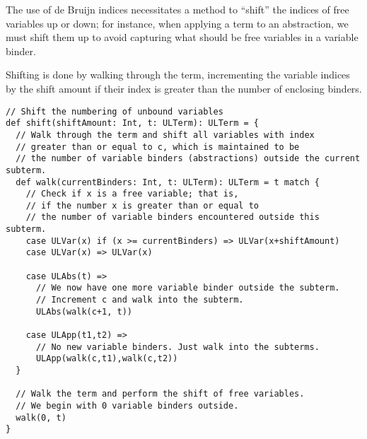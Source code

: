 \documentclass[11pt]{article}
\begin{document}
The use of de Bruijn indices necessitates a method to
“shift” the indices of free variables up or down;
for instance, when applying a term to an abstraction,
we must shift them up to avoid capturing what should be free variables
in a variable binder.

Shifting is done by walking through the term,
incrementing the variable indices by the shift amount
if their index is greater than the number of enclosing binders.
\begin{verbatim}
// Shift the numbering of unbound variables
def shift(shiftAmount: Int, t: ULTerm): ULTerm = {
  // Walk through the term and shift all variables with index
  // greater than or equal to c, which is maintained to be
  // the number of variable binders (abstractions) outside the current subterm.
  def walk(currentBinders: Int, t: ULTerm): ULTerm = t match {
    // Check if x is a free variable; that is,
    // if the number x is greater than or equal to
    // the number of variable binders encountered outside this subterm.
    case ULVar(x) if (x >= currentBinders) => ULVar(x+shiftAmount)
    case ULVar(x) => ULVar(x)
      
    case ULAbs(t) =>
      // We now have one more variable binder outside the subterm.
      // Increment c and walk into the subterm.
      ULAbs(walk(c+1, t))

    case ULApp(t1,t2) =>
      // No new variable binders. Just walk into the subterms.
      ULApp(walk(c,t1),walk(c,t2))
  }

  // Walk the term and perform the shift of free variables.
  // We begin with 0 variable binders outside.
  walk(0, t)
}
\end{verbatim}
\end{document}
